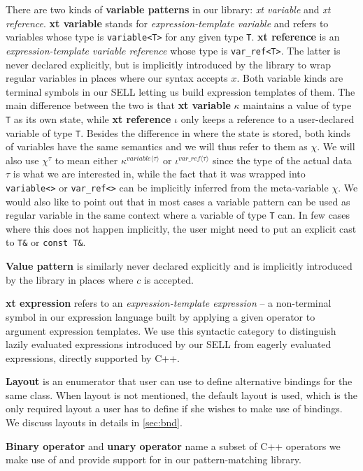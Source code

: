 \documentclass[preprint]{sigplanconf}
\makeatletter
\DeclareRobustCommand{\code}[1]{{\lstinline[breaklines=false,escapechar=@]{#1}}}
\makeatother
\begin{document}
There are two kinds of {\bf variable patterns} in our library: \emph{xt variable} 
and \emph{xt reference}. {\bf xt variable} stands for \emph{expression-template 
variable} and refers to variables whose type is \code{variable<T>} for any given 
type \code{T}. {\bf xt reference} is an \emph{expression-template variable 
reference} whose type is \code{var_ref<T>}. The latter is never declared 
explicitly, but is implicitly introduced by the library to wrap regular 
variables in places where our syntax accepts $x$. Both variable kinds are 
terminal symbols in our SELL letting us build expression templates of them. The 
main difference between the two is that {\bf xt variable} $\kappa$ maintains a 
value of type \code{T} as its own state, while {\bf xt reference} $\iota$ only 
keeps a reference to a user-declared variable of type \code{T}. Besides the 
difference in where the state is stored, both kinds of variables have the same 
semantics and we will thus refer to them as $\chi$. We will also use $\chi^\tau$ 
to mean either $\kappa^{variable\langle\tau\rangle}$ or 
$\iota^{var\_ref\langle\tau\rangle}$ since the type of the actual data $\tau$ is 
what we are interested in, while the fact that it was wrapped into 
\code{variable<>} or \code{var_ref<>} can be implicitly inferred from the 
meta-variable $\chi$. We would also like to point out that in most cases a 
variable pattern can be used as regular variable in the same context where a 
variable of type \code{T} can. In few cases where this does not happen 
implicitly, the user might need to put an explicit cast to \code{T&} or 
\code{const T&}.

{\bf Value pattern} is similarly never declared explicitly and is implicitly 
introduced by the library in places where $c$ is accepted.

{\bf xt expression} refers to an \emph{expression-template expression} -- a 
non-terminal symbol in our expression language built by applying a given 
operator to argument expression templates. We use this syntactic category to 
distinguish lazily evaluated expressions introduced by our SELL from eagerly 
evaluated expressions, directly supported by C++.

{\bf Layout} is an enumerator that user can use to define alternative bindings 
for the same class. When layout is not mentioned, the default layout is used, 
which is the only required layout a user has to define if she wishes to make use 
of bindings. We discuss layouts in details in \textsection\ref{sec:bnd}.

{\bf Binary operator} and {\bf unary operator} name a subset of C++ operators we 
make use of and provide support for in our pattern-matching library. 
\end{document}
